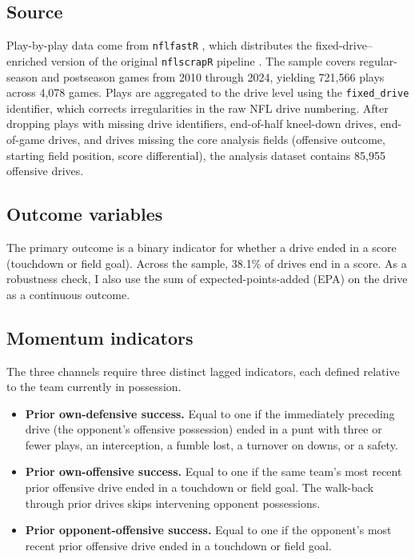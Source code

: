 \documentclass[11pt]{article}
\begin{document}
\subsection{Source}

Play-by-play data come from \texttt{nflfastR} \citep{nflfastr2024}, which
distributes the fixed-drive--enriched version of the original
\texttt{nflscrapR} pipeline \citep{yurko2018nflwar}. The sample covers
regular-season and postseason games from 2010 through 2024, yielding 721{,}566
plays across 4{,}078 games. Plays are aggregated to the drive level using the
\texttt{fixed\_drive} identifier, which corrects irregularities in the raw
NFL drive numbering. After dropping plays with missing drive identifiers,
end-of-half kneel-down drives, end-of-game drives, and drives missing the
core analysis fields (offensive outcome, starting field position, score
differential), the analysis dataset contains 85{,}955 offensive drives.

\subsection{Outcome variables}

The primary outcome is a binary indicator for whether a drive ended in a
score (touchdown or field goal). Across the sample, 38.1\% of drives end in
a score. As a robustness check, I also use the sum of expected-points-added
(EPA) on the drive as a continuous outcome.

\subsection{Momentum indicators}

The three channels require three distinct lagged indicators, each defined
relative to the team currently in possession.

\begin{itemize}
    \item \textbf{Prior own-defensive success.} Equal to one if the
    immediately preceding drive (the opponent's offensive possession) ended in
    a punt with three or fewer plays, an interception, a fumble lost, a
    turnover on downs, or a safety.
    \item \textbf{Prior own-offensive success.} Equal to one if the same
    team's most recent prior offensive drive ended in a touchdown or field
    goal. The walk-back through prior drives skips intervening opponent
    possessions.
    \item \textbf{Prior opponent-offensive success.} Equal to one if the
    opponent's most recent prior offensive drive ended in a touchdown or field
    goal.
\end{itemize}
\end{document}
